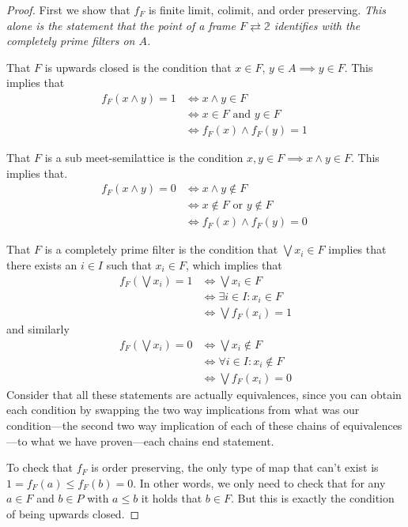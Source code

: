 \documentclass[12pt,a4paper]{article}
\begin{document}
 
\begin{proof}
 	First we show that $f_F$ is finite limit, colimit, and order preserving. \emph{This alone is the statement that the point of a frame $F \rightleftarrows \mathbb{2}$ identifies with the completely prime filters on $A$. }
  
 That $F$ is upwards closed is the condition that $x \in F$, $y \in A \implies y \in F$. This implies that
  \begin{align*}
 	f_F(x \wedge y) = 1 &\iff x \wedge y \in F\\ &\iff x \in F\text{ and } y \in F\\ &\iff f_F(x) \wedge f_F(y) =1 \
 \end{align*}
 
 
  That $F$ is a sub meet-semilattice is the condition $x, y \in F \implies x \land y \in F$. This implies that. \begin{align*}
 	f_F(x \wedge y) = 0 &\iff x \wedge y \notin F\\ &\iff x \notin F\text{ or } y \notin F\\ &\iff f_F(x)  \wedge f_F(y) =0 \
 \end{align*}


That $F$ is a completely prime filter is the condition that $\bigvee x_i \in F$ implies that there exists an $i \in I$ such that $x_i \in F$, which implies that \begin{align*}
	f_F( \bigvee x_i) = 1 &\iff \bigvee x_i \in F\\ &\iff \exists i \in I : x_i \in F\\
	&\iff \bigvee f_F(x_i) = 1
\end{align*}
and similarly \begin{align*}
	f_F( \bigvee x_i) = 0 &\iff \bigvee x_i \notin F\\ &\iff \forall i \in I:x_i \notin F \\
	&\iff \bigvee f_F(x_i)  = 0
\end{align*}
Consider that all these statements are actually equivalences, since you can obtain each condition by swapping the two way implications from what was our condition---the second two way implication of each of these chains of equivalences---to what we have proven---each chains end statement.

To check that $f_F$ is order preserving, the only type of map that can't exist is $ 1 =f_F(a) \leq f_F(b) = 0$. In other words, we only need to check that for any $a \in F$ and $b \in P$ with $a \leq b$ it holds that $b \in F$. But this is exactly the condition of being upwards closed. 


\end{proof}
\end{document}
